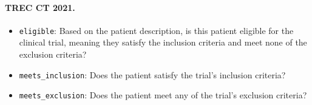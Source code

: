 \begin{small}
\paragraph{TREC CT 2021.}\begin{itemize}
\item \texttt{eligible}: Based on the patient description, is this patient eligible for the clinical trial, meaning they satisfy the inclusion criteria and meet none of the exclusion criteria?
\item \texttt{meets\_inclusion}: Does the patient satisfy the trial's inclusion criteria?
\item \texttt{meets\_exclusion}: Does the patient meet any of the trial's exclusion criteria?
\end{itemize}
\end{small}